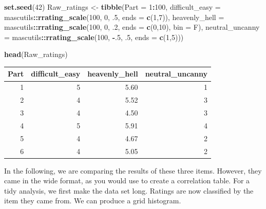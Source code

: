 \documentclass[]{svmono}
\newenvironment{Shaded}{\begin{snugshade}}{\end{snugshade}}
\newcommand{\KeywordTok}[1]{\textcolor[rgb]{0.13,0.29,0.53}{\textbf{#1}}}
\newcommand{\DataTypeTok}[1]{\textcolor[rgb]{0.13,0.29,0.53}{#1}}
\newcommand{\DecValTok}[1]{\textcolor[rgb]{0.00,0.00,0.81}{#1}}
\newcommand{\StringTok}[1]{\textcolor[rgb]{0.31,0.60,0.02}{#1}}
\newcommand{\OperatorTok}[1]{\textcolor[rgb]{0.81,0.36,0.00}{\textbf{#1}}}
\newcommand{\NormalTok}[1]{#1}
\begin{document}
\begin{Shaded}
\begin{Highlighting}[]
\KeywordTok{set.seed}\NormalTok{(}\DecValTok{42}\NormalTok{)}
\NormalTok{Raw_ratings <-}\StringTok{ }
\StringTok{  }\KeywordTok{tibble}\NormalTok{(}\DataTypeTok{Part =} \DecValTok{1}\OperatorTok{:}\DecValTok{100}\NormalTok{,}
         \DataTypeTok{difficult_easy  =}\NormalTok{ mascutils}\OperatorTok{::}\KeywordTok{rrating_scale}\NormalTok{(}\DecValTok{100}\NormalTok{, }\DecValTok{0}\NormalTok{, .}\DecValTok{5}\NormalTok{, }
                                                    \DataTypeTok{ends =} \KeywordTok{c}\NormalTok{(}\DecValTok{1}\NormalTok{,}\DecValTok{7}\NormalTok{)),}
         \DataTypeTok{heavenly_hell   =}\NormalTok{ mascutils}\OperatorTok{::}\KeywordTok{rrating_scale}\NormalTok{(}\DecValTok{100}\NormalTok{, }\DecValTok{0}\NormalTok{, .}\DecValTok{2}\NormalTok{, }
                                                    \DataTypeTok{ends =} \KeywordTok{c}\NormalTok{(}\DecValTok{0}\NormalTok{,}\DecValTok{10}\NormalTok{), }\DataTypeTok{bin =}\NormalTok{ F),}
         \DataTypeTok{neutral_uncanny =}\NormalTok{ mascutils}\OperatorTok{::}\KeywordTok{rrating_scale}\NormalTok{(}\DecValTok{100}\NormalTok{, }\OperatorTok{-}\NormalTok{.}\DecValTok{5}\NormalTok{, .}\DecValTok{5}\NormalTok{, }
                                                    \DataTypeTok{ends =} \KeywordTok{c}\NormalTok{(}\DecValTok{1}\NormalTok{,}\DecValTok{5}\NormalTok{)))}

\KeywordTok{head}\NormalTok{(Raw_ratings)}
\end{Highlighting}
\end{Shaded}

\begin{tabular}{r|r|r|r}
\hline
Part & difficult\_easy & heavenly\_hell & neutral\_uncanny\\
\hline
1 & 5 & 5.60 & 1\\
\hline
2 & 4 & 5.52 & 3\\
\hline
3 & 4 & 4.50 & 3\\
\hline
4 & 5 & 5.91 & 4\\
\hline
5 & 4 & 4.67 & 2\\
\hline
6 & 4 & 5.05 & 2\\
\hline
\end{tabular}

In the following, we are comparing the results of these three items.
However, they came in the wide format, as you would use to create a
correlation table. For a tidy analysis, we first make the data set long.
Ratings are now classified by the item they came from. We can produce a
grid histogram.
\end{document}
